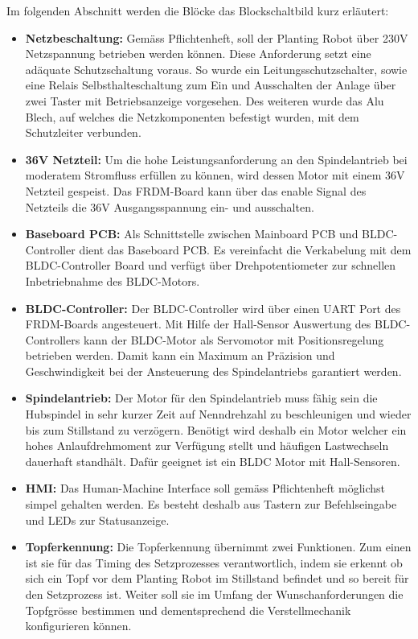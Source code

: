 Im folgenden Abschnitt werden die Blöcke das Blockschaltbild kurz erläutert:
\begin{itemize}
	\item \textbf{Netzbeschaltung:} Gemäss Pflichtenheft, soll der Planting Robot über 230V Netzspannung betrieben werden können. Diese Anforderung setzt eine adäquate Schutzschaltung voraus. So wurde ein Leitungsschutzschalter, sowie eine Relais Selbsthalteschaltung zum Ein und Ausschalten der Anlage über zwei Taster mit Betriebsanzeige vorgesehen. Des weiteren wurde das Alu Blech, auf welches die Netzkomponenten befestigt wurden, mit dem Schutzleiter verbunden.

	\item \textbf{36V Netzteil:} Um die hohe Leistungsanforderung an den Spindelantrieb bei moderatem Stromfluss erfüllen zu können, wird dessen Motor mit einem 36V Netzteil gespeist. Das FRDM-Board kann über das enable Signal des Netzteils die 36V Ausgangsspannung ein- und ausschalten.
	
	\item \textbf{Baseboard PCB:} Als Schnittstelle zwischen Mainboard PCB und BLDC-Controller dient das Baseboard PCB. Es vereinfacht die Verkabelung mit dem BLDC-Controller Board und verfügt über Drehpotentiometer zur schnellen Inbetriebnahme des BLDC-Motors.
	
	\item \textbf{BLDC-Controller:} Der BLDC-Controller wird über einen UART Port des FRDM-Boards angesteuert. Mit Hilfe der Hall-Sensor Auswertung des BLDC-Controllers kann der BLDC-Motor als Servomotor mit Positionsregelung betrieben werden. Damit kann ein Maximum an Präzision und Geschwindigkeit bei der Ansteuerung des Spindelantriebs garantiert werden.
	
	\item \textbf{Spindelantrieb:} Der Motor für den Spindelantrieb muss fähig sein die Hubspindel in sehr kurzer Zeit auf Nenndrehzahl zu beschleunigen und wieder bis zum Stillstand zu verzögern. Benötigt wird deshalb ein Motor welcher ein hohes Anlaufdrehmoment zur Verfügung stellt und häufigen Lastwechseln dauerhaft standhält. Dafür geeignet ist ein BLDC Motor mit Hall-Sensoren.
		
	\item \textbf{HMI:} Das Human-Machine Interface soll gemäss Pflichtenheft möglichst simpel gehalten werden. Es besteht deshalb aus Tastern zur Befehlseingabe und LEDs zur Statusanzeige. 
		
	\item \textbf{Topferkennung:} Die Topferkennung übernimmt zwei Funktionen. Zum einen ist sie für das Timing des Setzprozesses verantwortlich, indem sie erkennt ob sich ein Topf vor dem Planting Robot im Stillstand befindet und so bereit für den Setzprozess ist. Weiter soll sie im Umfang der Wunschanforderungen die Topfgrösse bestimmen und dementsprechend die Verstellmechanik konfigurieren können.
	

\end{itemize}
